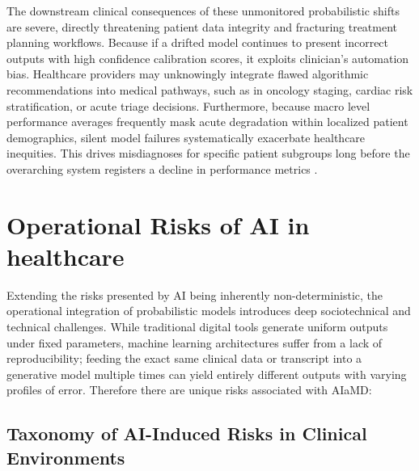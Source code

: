 \documentclass[11pt,a4paper]{article}
\begin{document}
The downstream clinical consequences of these unmonitored probabilistic shifts are severe, directly threatening patient data integrity and fracturing treatment planning workflows. Because if  a drifted model continues to present incorrect outputs with high confidence calibration scores, it exploits clinician's automation bias. Healthcare providers may unknowingly integrate flawed algorithmic recommendations into medical  pathways, such as in oncology staging, cardiac risk stratification, or acute triage decisions.
Furthermore, because macro level performance averages frequently mask acute degradation within localized patient demographics, silent model failures systematically exacerbate healthcare inequities. This drives misdiagnoses for specific patient subgroups long before the overarching system registers a decline in performance metrics \cite{guan2026} . 




\section{Operational Risks of AI in healthcare}
\label{sec:Operational Risks of AI in healthcare}

Extending the risks presented by AI being inherently non-deterministic, the operational integration of probabilistic models introduces deep sociotechnical and technical challenges. While traditional digital tools generate uniform outputs under fixed parameters, machine learning architectures suffer from a  lack of reproducibility; feeding the exact same clinical data or transcript into a generative model multiple times can yield entirely different outputs with varying profiles of error.  Therefore there are unique risks associated with AIaMD:

\subsection{Taxonomy of AI-Induced Risks in Clinical Environments}
\label{sec:Taxonomy of AI-Induced Risks in Clinical Environments}
\end{document}
